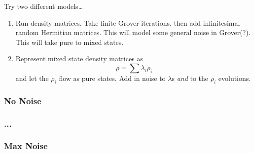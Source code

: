 Try two different models\dots
\begin{enumerate}
\item Run density matrices.  Take finite Grover iterations, then add
infinitesimal random Hermitian matrices.  This will model some general
noise in Grover(?). This will take pure to mixed states.
\item Represent mixed state density matrices as
\begin{equation}
\rho = \sum\lambda_i\rho_i
\end{equation}
and let the $\rho_i$ flow as pure states.  Add in noise to $\lambda$s
{\sl and} to the $\rho_i$ evolutions.
\end{enumerate}

\subsubsection{No Noise}
\subsubsection{...}
\subsubsection{Max Noise}


